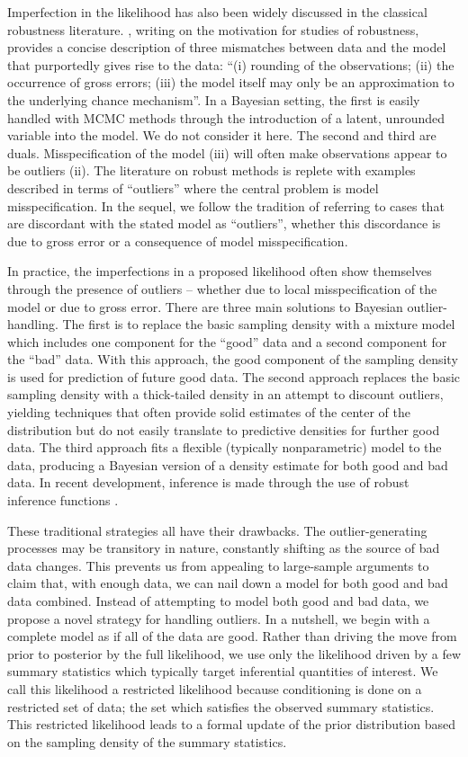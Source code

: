 \documentclass[ba]{imsart}
\begin{document}
Imperfection in the likelihood has also been widely discussed in the classical robustness literature. \cite{hampel1971}, writing on the motivation for studies of robustness, provides a concise description of three mismatches between data and the model that purportedly gives rise to the data:  ``(i) rounding of the observations; (ii) the occurrence of gross errors; (iii) the model itself may only be an approximation to the underlying chance mechanism''.  In a Bayesian setting, the first is easily handled with MCMC methods through the introduction of a latent, unrounded variable into the model.  We do not consider it here.  The second and third are duals.  Misspecification of the model (iii) will often make observations appear to be outliers (ii).  The literature on robust methods is replete with examples described in terms of ``outliers'' where the central problem is model misspecification.  In the sequel, we follow the tradition of referring to cases that are discordant with the stated model as ``outliers'', whether this discordance is due to gross error or a consequence of model misspecification.

In practice, the imperfections in a proposed likelihood often show themselves through the presence of outliers -- whether due to local misspecification of the model or due to gross error. There are three main solutions to Bayesian outlier-handling.  The first is to replace the basic sampling density with a mixture model which includes one component for the ``good'' data and a second component for the ``bad'' data.  With this approach, the good component of the sampling density is used for prediction of future good data.  The second approach replaces the
basic sampling density with a thick-tailed density in an attempt to discount outliers, yielding techniques that often provide solid estimates of the center of the distribution but do not easily translate to predictive densities for further good data.  The third approach fits a flexible (typically nonparametric) model to  the data, producing a Bayesian version of a density estimate for both good and bad data.  In recent development, inference is made through the use of robust inference functions \citep{lee2014}.  

These traditional strategies  all have their drawbacks.  The outlier-generating processes 
may be transitory in nature, constantly shifting as the source of bad data changes.  This prevents us from appealing to large-sample arguments to claim that, with enough data, we can nail down a model for both good and bad data combined.  Instead of attempting to model both good and bad data, we propose a novel strategy for handling outliers. In a nutshell, we begin with a complete model  as if all of the data are good. Rather than driving the move from prior to posterior  by the full likelihood, we use only the likelihood driven by a few summary statistics which typically target inferential quantities
of interest.  We call this likelihood a restricted likelihood because conditioning is done on a restricted set of data; the set which satisfies the observed summary statistics. This restricted likelihood leads to a formal update of the prior distribution based on the sampling density of the summary statistics. 
\end{document}
